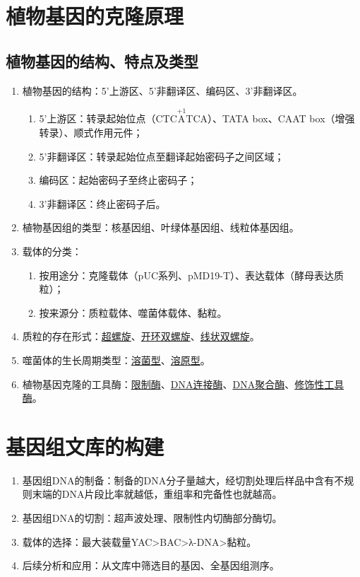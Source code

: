 \section{植物基因的克隆原理}
\subsection{植物基因的结构、特点及类型}
\begin{enumerate}
    \item 植物基因的结构：5'上游区、5'非翻译区、编码区、3'非翻译区。
    \begin{enumerate}
        \item 5'上游区：转录起始位点（CTC$\overset{+1}{\text{A}}$TCA）、TATA box、CAAT box（增强转录）、顺式作用元件；
        \item 5'非翻译区：转录起始位点至翻译起始密码子之间区域；
        \item 编码区：起始密码子至终止密码子；
        \item 3'非翻译区：终止密码子后。
    \end{enumerate}
    \item 植物基因组的类型：核基因组、叶绿体基因组、线粒体基因组。
    \item 载体的分类：
    \begin{enumerate}
        \item 按用途分：克隆载体（pUC系列、pMD19-T）、表达载体（酵母表达质粒）；
        \item 按来源分：质粒载体、噬菌体载体、黏粒。
    \end{enumerate}
    \item 质粒的存在形式：\uline{超螺旋}、\uline{开环双螺旋}、\uline{线状双螺旋}。
    \item 噬菌体的生长周期类型：\uline{溶菌型}、\uline{溶原型}。
    \item 植物基因克隆的工具酶：\uline{限制酶}、\uline{DNA连接酶}、\uline{DNA聚合酶}、\uline{修饰性工具酶}。
\end{enumerate}

\section{基因组文库的构建}
\begin{enumerate}
    \item 基因组DNA的制备：制备的DNA分子量越大，经切割处理后样品中含有不规则末端的DNA片段比率就越低，重组率和完备性也就越高。
    \item 基因组DNA的切割：超声波处理、限制性内切酶部分酶切。
    \item 载体的选择：最大装载量YAC>BAC>λ-DNA>黏粒。
    \item 后续分析和应用：从文库中筛选目的基因、全基因组测序。
\end{enumerate}

